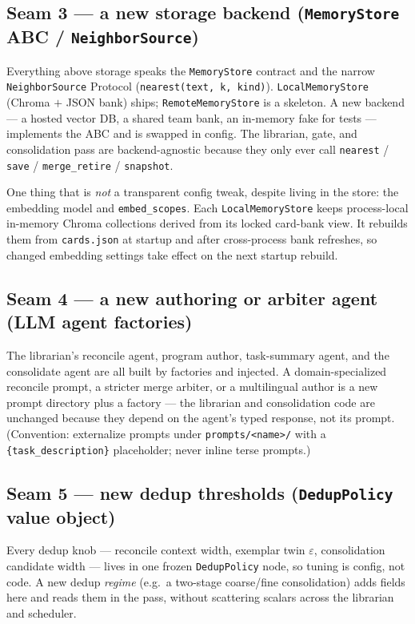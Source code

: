 \documentclass[11pt]{article}
\newcommand{\code}[1]{\texttt{\small #1}}
\begin{document}
\subsection{Seam 3 --- a new storage backend (\code{MemoryStore} ABC / \code{NeighborSource})}

Everything above storage speaks the \code{MemoryStore} contract and the narrow
\code{NeighborSource} Protocol (\code{nearest(text, k, kind)}). \code{LocalMemoryStore}
(Chroma $+$ JSON bank) ships; \code{RemoteMemoryStore} is a skeleton. A new
backend --- a hosted vector DB, a shared team bank, an in-memory fake for tests
--- implements the ABC and is swapped in config. The librarian, gate, and
consolidation pass are backend-agnostic because they only ever call
\code{nearest} / \code{save} / \code{merge\_retire} / \code{snapshot}.

One thing that is \emph{not} a transparent config tweak, despite living in the store:
the embedding model and \code{embed\_scopes}. Each \code{LocalMemoryStore} keeps
process-local in-memory Chroma collections derived from its locked card-bank view.
It rebuilds them from \code{cards.json} at startup and after cross-process bank
refreshes, so changed embedding settings take effect on the next startup rebuild.

\subsection{Seam 4 --- a new authoring or arbiter agent (LLM agent factories)}

The librarian's reconcile agent, program author, task-summary agent, and the
consolidate agent are all built by factories and injected. A domain-specialized
reconcile prompt, a stricter merge arbiter, or a multilingual author is a new
prompt directory plus a factory --- the librarian and consolidation code are
unchanged because they depend on the agent's typed response, not its prompt.
(Convention: externalize prompts under \code{prompts/<name>/} with a
\code{\{task\_description\}} placeholder; never inline terse prompts.)

\subsection{Seam 5 --- new dedup thresholds (\code{DedupPolicy} value object)}

Every dedup knob --- reconcile context width, exemplar twin $\varepsilon$,
consolidation candidate width --- lives in one frozen \code{DedupPolicy} node, so
tuning is config, not code. A new dedup \emph{regime} (e.g.\ a two-stage
coarse/fine consolidation) adds fields here and reads them in the pass, without
scattering scalars across the librarian and scheduler.
\end{document}
